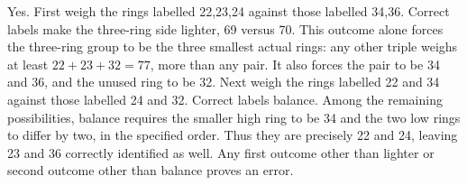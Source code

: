 Yes. First weigh the rings labelled 22,23,24 against those labelled 34,36. Correct labels make the three-ring side lighter, 69 versus 70. This outcome alone forces the three-ring group to be the three smallest actual rings: any other triple weighs at least $22+23+32=77$, more than any pair. It also forces the pair to be 34 and 36, and the unused ring to be 32. Next weigh the rings labelled 22 and 34 against those labelled 24 and 32. Correct labels balance. Among the remaining possibilities, balance requires the smaller high ring to be 34 and the two low rings to differ by two, in the specified order. Thus they are precisely 22 and 24, leaving 23 and 36 correctly identified as well. Any first outcome other than lighter or second outcome other than balance proves an error.
